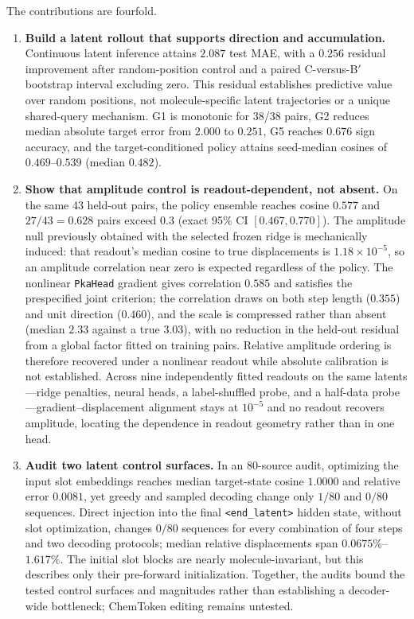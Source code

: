\documentclass[11pt]{article}
\begin{document}
The contributions are fourfold.
\begin{enumerate}[leftmargin=1.5em]
  \item \textbf{Build a latent rollout that supports direction and accumulation.} Continuous latent inference attains $2.087$ test MAE, with a $0.256$ residual improvement after random-position control and a paired C-versus-B$'$ bootstrap interval excluding zero. This residual establishes predictive value over random positions, not molecule-specific latent trajectories or a unique shared-query mechanism. G1 is monotonic for 38/38 pairs, G2 reduces median absolute target error from $2.000$ to $0.251$, G5 reaches $0.676$ sign accuracy, and the target-conditioned policy attains seed-median cosines of $0.469$--$0.539$ (median $0.482$).
  \item \textbf{Show that amplitude control is readout-dependent, not absent.} On the same 43 held-out pairs, the policy ensemble reaches cosine $0.577$ and $27/43=0.628$ pairs exceed $0.3$ (exact 95\% CI $[0.467,0.770]$). The amplitude null previously obtained with the selected frozen ridge is mechanically induced: that readout's median cosine to true displacements is $1.18\times10^{-5}$, so an amplitude correlation near zero is expected regardless of the policy. The nonlinear \texttt{PkaHead} gradient gives correlation $0.585$ and satisfies the prespecified joint criterion; the correlation draws on both step length ($0.355$) and unit direction ($0.460$), and the scale is compressed rather than absent (median $2.33$ against a true $3.03$), with no reduction in the held-out residual from a global factor fitted on training pairs. Relative amplitude ordering is therefore recovered under a nonlinear readout while absolute calibration is not established. Across nine independently fitted readouts on the same latents---ridge penalties, neural heads, a label-shuffled probe, and a half-data probe---gradient--displacement alignment stays at $10^{-5}$ and no readout recovers amplitude, locating the dependence in readout geometry rather than in one head.
  \item \textbf{Audit two latent control surfaces.} In an 80-source audit, optimizing the  input slot embeddings reaches median target-state cosine $1.0000$ and relative error $0.0081$, yet greedy and sampled decoding change only $1/80$ and $0/80$ sequences. Direct injection into the final \texttt{<end\_latent>} hidden state, without slot optimization, changes $0/80$ sequences for every combination of four steps and two decoding protocols; median relative displacements span $0.0675\%$--$1.617\%$. The initial slot blocks are nearly molecule-invariant, but this describes only their pre-forward initialization. Together, the audits bound the tested control surfaces and magnitudes rather than establishing a decoder-wide bottleneck; ChemToken editing remains untested.

\end{enumerate}
\end{document}
